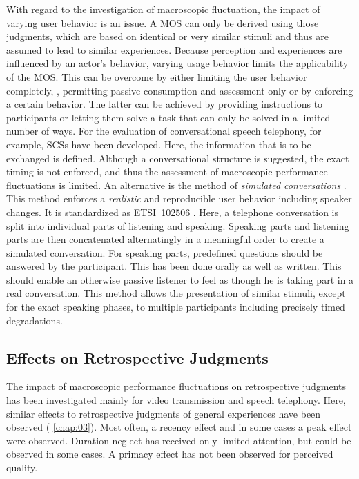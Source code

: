 With regard to the investigation of macroscopic fluctuation, the impact of varying user behavior is an issue.
A \ac{MOS} can only be derived using those judgments, which are based on identical or very similar stimuli and thus are assumed to lead to similar experiences.
Because perception and experiences are influenced by an actor's behavior, varying usage behavior limits the applicability of the \ac{MOS}.
This can be overcome by either limiting the user behavior completely, \ie, permitting passive consumption and assessment only or by enforcing a certain behavior.
The latter can be achieved by providing instructions to participants or letting them solve a task that can only be solved in a limited number of ways.
For the evaluation of conversational speech telephony, for example, \acp{SCS} have been developed.
Here, the information that is to be exchanged is defined.
Although a conversational structure is suggested, the exact timing is not enforced, and thus the assessment of macroscopic performance fluctuations is limited.
An alternative is the method of \emph{simulated conversations} \citep{weiss_modeling_2009, berger_estimation_2008}.
This method enforces a \emph{realistic} and reproducible user behavior including speaker changes.
It is standardized as ETSI~102506 \citep{etsi_speech_2011}.
Here, a telephone conversation is split into individual parts of listening and speaking.
Speaking parts and listening parts are then concatenated alternatingly in a meaningful order to create a simulated conversation.
For speaking parts, predefined questions should be answered by the participant.
This has been done orally as well as written.
This should enable an otherwise passive listener to feel as though he is taking part in a real conversation.
This method allows the presentation of similar stimuli, except for the exact speaking phases, to multiple participants including precisely timed degradations.

\subsection{Effects on Retrospective Judgments}
The impact of macroscopic performance fluctuations on retrospective judgments has been investigated mainly for video transmission and speech telephony.
Here, similar effects to retrospective judgments of general experiences have been observed (\cf{} \autoref{chap:03}).
Most often, a recency effect and in some cases a peak effect were observed.
Duration neglect has received only limited attention, but could be observed in some cases.
A primacy effect has not been observed for perceived quality.

